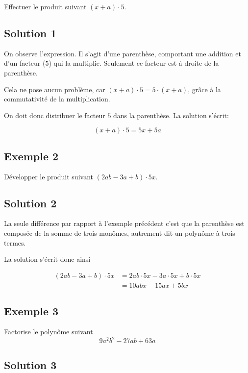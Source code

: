 \documentclass[
  12pt,
]{book}
\begin{document}
Effectuer le produit suivant \((x+a)\cdot 5\).

\hypertarget{solution-1-1}{%
\subsection*{Solution 1}\label{solution-1-1}}

On observe l'expression. Il s'agit d'une parenthèse, comportant une addition et d'un facteur (\(5\)) qui la multiplie. Seulement ce facteur est à droite de la parenthèse.

Cela ne pose aucun problème, car \((x+a)\cdot 5 = 5\cdot (x+a)\), grâce à la commutativité de la multiplication.

On doit donc distribuer le facteur \(5\) dans la parenthèse. La solution s'écrit:

\[(x+a)\cdot 5= 5x+5a\]

\hypertarget{exemple-2-2}{%
\subsection{Exemple 2}\label{exemple-2-2}}

Développer le produit suivant \((2ab-3a+b)\cdot 5x\).

\hypertarget{solution-2-1}{%
\subsection*{Solution 2}\label{solution-2-1}}

La seule différence par rapport à l'exemple précédent c'est que la parenthèse est composée de la somme de trois monômes, autrement dit un polynôme à trois termes.

La solution s'écrit donc ainsi

\begin{align*}
(2ab-3a+b)\cdot 5x & =2ab\cdot 5x-3a\cdot 5x + b\cdot 5x \\
& = 10abx-15ax+5bx
\end{align*}

\hypertarget{exemple-3}{%
\subsection{Exemple 3}\label{exemple-3}}

Factorise le polynôme suivant \[9a^2b^2-27ab+63a\]

\hypertarget{solution-3}{%
\subsection*{Solution 3}\label{solution-3}}
\end{document}
